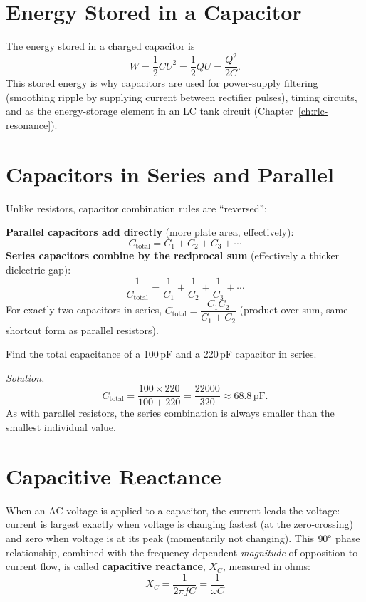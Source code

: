 \section{Energy Stored in a Capacitor}

The energy stored in a charged capacitor is
\[
W = \frac{1}{2}CU^2 = \frac{1}{2}QU = \frac{Q^2}{2C}.
\]
This stored energy is why capacitors are used for power-supply filtering
(smoothing ripple by supplying current between rectifier pulses),
timing circuits, and as the energy-storage element in an LC tank circuit
(Chapter~\ref{ch:rlc-resonance}).

\section{Capacitors in Series and Parallel}

Unlike resistors, capacitor combination rules are ``reversed'':

\begin{keyidea}
\textbf{Parallel capacitors add directly} (more plate area, effectively):
\[
C_{\text{total}} = C_1 + C_2 + C_3 + \cdots
\]
\textbf{Series capacitors combine by the reciprocal sum} (effectively a
thicker dielectric gap):
\[
\frac{1}{C_{\text{total}}} = \frac{1}{C_1} + \frac{1}{C_2} + \frac{1}{C_3} + \cdots
\]
For exactly two capacitors in series, $C_{\text{total}} = \dfrac{C_1
C_2}{C_1+C_2}$ (product over sum, same shortcut form as parallel
resistors).
\end{keyidea}

\begin{examplebox}
Find the total capacitance of a 100\,pF and a 220\,pF capacitor in
series.

\emph{Solution.}
\[
C_{\text{total}} = \frac{100 \times 220}{100+220} = \frac{22000}{320} \approx 68.8\,\text{pF}.
\]
As with parallel resistors, the series combination is always smaller than
the smallest individual value.
\end{examplebox}

\section{Capacitive Reactance}
\label{sec:xc}

When an AC voltage is applied to a capacitor, the current leads the
voltage: current is largest exactly when voltage is changing fastest
(at the zero-crossing) and zero when voltage is at its peak (momentarily
not changing). This $90\degree$ phase relationship, combined with the
frequency-dependent \emph{magnitude} of opposition to current flow, is
called \textbf{capacitive reactance}, $X_C$, measured in ohms:
\[
\boxed{X_C = \frac{1}{2\pi f C} = \frac{1}{\omega C}}
\]

